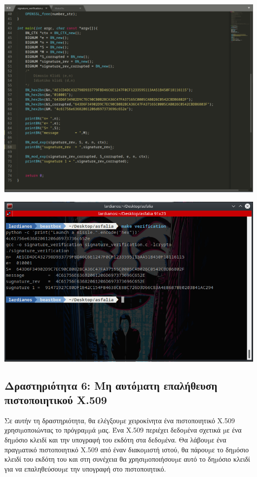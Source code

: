 \begin{center}
			\includegraphics[width=1\textwidth]{image/image35code.PNG}		
\end{center}
\begin{center}
			\includegraphics[width=1\textwidth]{image/image35term.PNG}		
\end{center}
\subsection{Δραστηριότητα 6: Μη αυτόµατη επαλήθευση πιστοποιητικού X.509}
\noindent

Σε αυτήν τη δραστηριότητα, θα ελέγξουµε χειροκίνητα ένα πιστοποιητικό X.509
χρησιµοποιώντας το πρόγραµµά µας. Ένα X.509 περιέχει δεδοµένα σχετικά µε ένα δηµόσιο
κλειδί και την υπογραφή του εκδότη στα δεδοµένα. Θα λάβουµε ένα πραγµατικό πιστοποιητικό
X.509 από έναν διακοµιστή ιστού, θα πάρουµε το δηµόσιο κλειδί του εκδότη του και στη
συνέχεια θα χρησιµοποιήσουµε αυτό το δηµόσιο κλειδί για να επαληθεύσουµε την υπογραφή
στο πιστοποιητικό.

